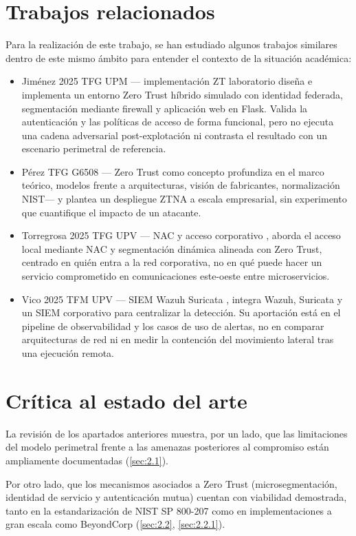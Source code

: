 \documentclass[11pt,spanish,listoffigures,listoftables]{tfgetsinf}
\begin{document}
    \section{Trabajos relacionados}
    \label{sec:2.4}
    Para la realización de este trabajo, se han estudiado algunos trabajos similares dentro de este mismo ámbito para entender el contexto de la situación académica:
    \begin{itemize}
        \item Jiménez 2025 TFG UPM — implementación ZT laboratorio \cite{jimenez2025} diseña e implementa un entorno Zero Trust híbrido simulado con identidad federada, segmentación mediante firewall y aplicación web en Flask. Valida la autenticación y las políticas de acceso de forma funcional, pero no ejecuta una cadena adversarial post-explotación ni contrasta el resultado con un escenario perimetral de referencia.
        \item Pérez TFG G6508 — Zero Trust como concepto \cite{perezg6508} profundiza en el marco teórico, modelos frente a arquitecturas, visión de fabricantes, normalización NIST— y plantea un despliegue ZTNA a escala empresarial, sin experimento que cuantifique el impacto de un atacante.
        \item Torregrosa 2025 TFG UPV — NAC y acceso corporativo \cite{torregrosa2025}, aborda el acceso local mediante NAC y segmentación dinámica alineada con Zero Trust, centrado en quién entra a la red corporativa, no en qué puede hacer un servicio comprometido en comunicaciones este-oeste entre microservicios. 
        \item Vico 2025 TFM UPV — SIEM Wazuh Suricata \cite{vico2025}, integra Wazuh, Suricata y un SIEM corporativo para centralizar la detección. Su aportación está en el pipeline de observabilidad y los casos de uso de alertas, no en comparar arquitecturas de red ni en medir la contención del movimiento lateral tras una ejecución remota.
    \end{itemize}
    
    \section{Crítica al estado del arte}
    La revisión de los apartados anteriores muestra, por un lado, que las limitaciones del modelo perimetral frente a las amenazas posteriores al compromiso están ampliamente documentadas (\cref{sec:2.1}). 
    
    Por otro lado, que los mecanismos asociados a Zero Trust (microsegmentación, identidad de servicio y autenticación mutua) cuentan con viabilidad demostrada, tanto en la estandarización de NIST SP 800-207 como en implementaciones a gran escala como BeyondCorp (\cref{sec:2.2}, \cref{sec:2.2.1}).
    
\end{document}
